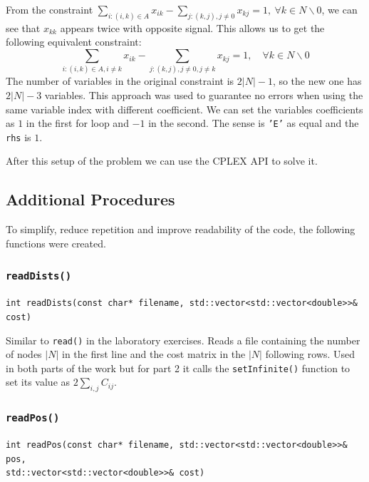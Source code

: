 \documentclass[a4paper,12pt]{article}
\begin{document}
			From the constraint $ \sum_{i:(i,k)\in A} x_{ik} - \sum_{j:(k,j),j\ne 0} x_{kj} = 1, \ \forall k \in N \backslash 0 $,	we can see that $x_{kk}$ appears twice with opposite signal.
			This allows us to get the following equivalent constraint:
			\begin{equation}
				\sum_{i:(i,k)\in A,i\ne k} x_{ik} - \sum_{j:(k,j),j\ne 0, j \ne k} x_{kj} = 1,  \quad \forall k \in N \backslash 0
			\end{equation}
			The number of variables in the original constraint is $2|N|-1 $, so the new one has $ 2|N|-3 $  variables.
			This approach was used to guarantee no errors when using the same variable index with different coefficient.
			We can set the variables coefficients as $ 1 $ in the first for loop and $ -1 $ in the second.
			The sense is \texttt{'E'} as equal and the \texttt{rhs} is $ 1 $.
			
			After this setup of the problem we can use the CPLEX API to solve it.
			
		\subsection{Additional Procedures}		 
			To simplify, reduce repetition and improve readability of the code, the following functions were created.
			
			\subsubsection{\texttt{readDists()}}
			\hspace{-20pt}\texttt{int readDists(const char* filename, std::vector<std::vector<double>>\& cost)}
					
				Similar to \texttt{read()} in the laboratory exercises. 
				Reads a file containing the number of nodes $ |N| $ in the first line and the cost matrix in the $ |N| $ following rows.
				Used in both parts of the work but for part 2 it calls the \texttt{setInfinite()} function to set its value as $ 2 \sum_{i,j} C_{ij}  $.
			
			\subsubsection{\texttt{readPos()}}
			\hspace{-20pt}\texttt{int readPos(const char* filename, std::vector<std::vector<double>>\& pos, \\ std::vector<std::vector<double>>\& cost)}
					
\end{document}
